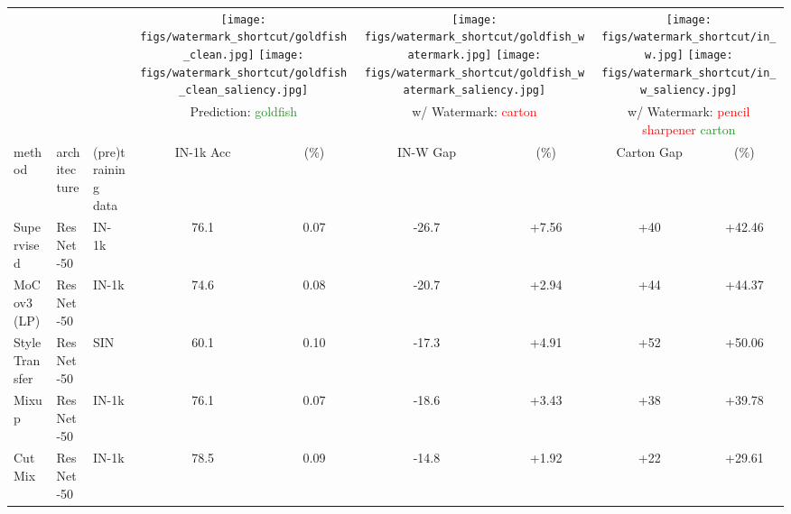 \documentclass[10pt,twocolumn,letterpaper]{article}
\begin{document}
\begin{table*}[t]
\centering
{}
\begin{adjustbox}{width=\linewidth}
\begin{tabular}{@{}lll|cc|cc|cc@{}}
             &              &                  & \multicolumn{2}{c|}{ \texttt{[image: figs/watermark\_shortcut/goldfish\_clean.jpg]} \texttt{[image: figs/watermark\_shortcut/goldfish\_clean\_saliency.jpg]} }            & \multicolumn{2}{c|}{ \texttt{[image: figs/watermark\_shortcut/goldfish\_watermark.jpg]} \texttt{[image: figs/watermark\_shortcut/goldfish\_watermark\_saliency.jpg]} }                &  \multicolumn{2}{c}{\texttt{[image: figs/watermark\_shortcut/in\_w.jpg]} \texttt{[image: figs/watermark\_shortcut/in\_w\_saliency.jpg]}}                \\
             &              &                  & \multicolumn{2}{c|}{Prediction: \textcolor{ForestGreen}{goldfish} } & \multicolumn{2}{c|}{w/ Watermark: \textcolor{red}{carton}} & \multicolumn{2}{c}{w/ Watermark: \textcolor{red}{pencil sharpener}   \textcolor{ForestGreen}{carton}}   \\ \toprule \toprule
method  & architecture & (pre)training data                  & IN-1k Acc  &  (\%) & IN-W Gap  &  (\%)  & Carton Gap  &  (\%)  \\ \midrule
Supervised     & ResNet-50~\cite{he2016IEEEConf.Comput.Vis.PatternRecognit.CVPRDeep}    & IN-1k~\cite{deng2009IEEEConf.Comput.Vis.PatternRecognit.CVPRImageNet}                       & 76.1       & 0.07           & -26.7 & +7.56  & +40 &  +42.46    \\
MoCov3~\cite{chen2021IEEECVFInt.Conf.Comput.Vis.ICCVEmpirical} (LP)     & ResNet-50    & IN-1k                       &  74.6  & 0.08                & -20.7 & +2.94  & +44 &  +44.37    \\
Style Transfer~\cite{geirhos2019Int.Conf.Learn.Represent.ImageNettrained}  & ResNet-50    & SIN~\cite{geirhos2019Int.Conf.Learn.Represent.ImageNettrained}                       & 60.1   &   0.10             & -17.3 & +4.91  & +52 &   +50.06    \\
Mixup~\cite{zhang2018Int.Conf.Learn.Represent.mixup}     & ResNet-50    & IN-1k                       &  76.1  & 0.07                & -18.6 & +3.43  & +38 &  +39.78    \\
CutMix~\cite{yun2019IEEECVFInt.Conf.Comput.Vis.ICCVCutMix}     & ResNet-50    & IN-1k                       &  78.5  & 0.09                & -14.8 & +1.92  & +22 &  +29.61    \\

\end{tabular}
\end{adjustbox}
\end{table*}
\end{document}
